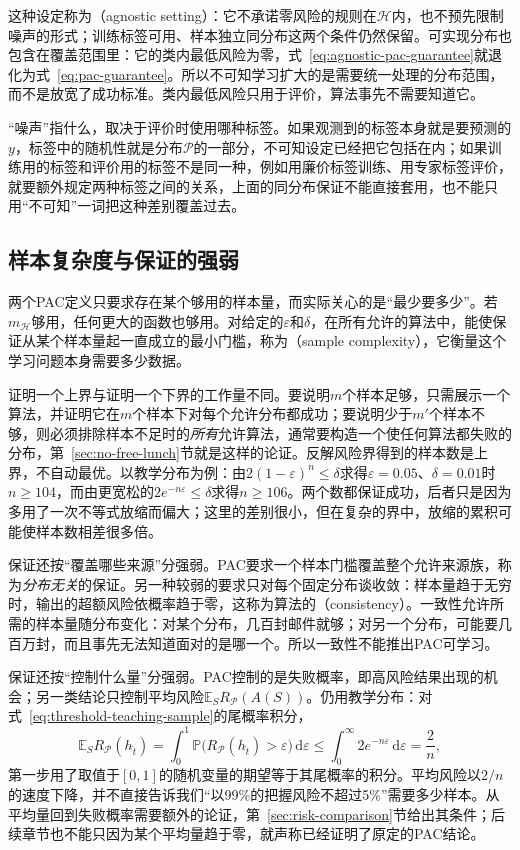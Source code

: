 这种设定称为（agnostic setting）：它不承诺零风险的规则在$\mathcal H$内，也不预先限制噪声的形式；训练标签可用、样本独立同分布这两个条件仍然保留。可实现分布也包含在覆盖范围里：它的类内最低风险为零，式~\eqref{eq:agnostic-pac-guarantee}就退化为式~\eqref{eq:pac-guarantee}。所以不可知学习扩大的是需要统一处理的分布范围，而不是放宽了成功标准。类内最低风险只用于评价，算法事先不需要知道它。

“噪声”指什么，取决于评价时使用哪种标签。如果观测到的标签本身就是要预测的$y$，标签中的随机性就是分布$\mathcal P$的一部分，不可知设定已经把它包括在内；如果训练用的标签和评价用的标签不是同一种，例如用廉价标签训练、用专家标签评价，就要额外规定两种标签之间的关系，上面的同分布保证不能直接套用，也不能只用“不可知”一词把这种差别覆盖过去。

\subsection{样本复杂度与保证的强弱}
\label{sec:pac-sample-complexity}

两个PAC定义只要求存在某个够用的样本量，而实际关心的是“最少要多少”。若$m_{\mathcal H}$够用，任何更大的函数也够用。对给定的$\varepsilon$和$\delta$，在所有允许的算法中，能使保证从某个样本量起一直成立的最小门槛，称为（sample complexity），它衡量这个学习问题本身需要多少数据。

证明一个上界与证明一个下界的工作量不同。要说明$m$个样本足够，只需展示一个算法，并证明它在$m$个样本下对每个允许分布都成功；要说明少于$m'$个样本不够，则必须排除样本不足时的\emph{所有}允许算法，通常要构造一个使任何算法都失败的分布，第~\ref{sec:no-free-lunch}节就是这样的论证。反解风险界得到的样本数是上界，不自动最优。以教学分布为例：由$2(1-\varepsilon)^n\leq\delta$求得$\varepsilon=0.05$、$\delta=0.01$时$n\geq104$，而由更宽松的$2e^{-n\varepsilon}\leq\delta$求得$n\geq106$。两个数都保证成功，后者只是因为多用了一次不等式放缩而偏大；这里的差别很小，但在复杂的界中，放缩的累积可能使样本数相差很多倍。

保证还按“覆盖哪些来源”分强弱。PAC要求一个样本门槛覆盖整个允许来源族，称为\emph{分布无关}的保证。另一种较弱的要求只对每个固定分布谈收敛：样本量趋于无穷时，输出的超额风险依概率趋于零，这称为算法的（consistency）。一致性允许所需的样本量随分布变化：对某个分布，几百封邮件就够；对另一个分布，可能要几百万封，而且事先无法知道面对的是哪一个。所以一致性不能推出PAC可学习。

保证还按“控制什么量”分强弱。PAC控制的是失败概率，即高风险结果出现的机会；另一类结论只控制平均风险$\mathbb E_SR_{\mathcal P}(A(S))$。仍用教学分布：对式~\eqref{eq:threshold-teaching-sample}的尾概率积分，
\[
 \mathbb E_SR_{\mathcal P}(h_{\hat t})
 =\int_0^1\mathbb P\bigl(R_{\mathcal P}(h_{\hat t})>\varepsilon\bigr)\,\mathrm d\varepsilon
 \leq\int_0^\infty2e^{-n\varepsilon}\,\mathrm d\varepsilon=\frac2n,
\]
第一步用了取值于$[0,1]$的随机变量的期望等于其尾概率的积分。平均风险以$2/n$的速度下降，并不直接告诉我们“以99\%的把握风险不超过5\%”需要多少样本。从平均量回到失败概率需要额外的论证，第~\ref{sec:risk-comparison}节给出其条件；后续章节也不能只因为某个平均量趋于零，就声称已经证明了原定的PAC结论。

